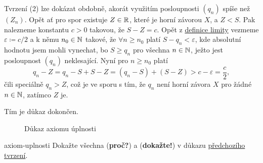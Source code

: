 \begin{propproof}
 Tvrzení (2) lze dokázat obdobně, akorát využitím posloupnosti $(q_n)$ spíše než
 $(Z_n)$. Opět ať pro spor existuje $Z \in \mathbb{R}$, které je horní závorou $X$, a $Z
 < S$. Pak nalezneme konstantu $c > 0$ takovou, že $S - Z = c$. Opět z
 \hyperref[def:limita-posloupnosti]{definice limity} vezmeme $\varepsilon
 \coloneqq c / 2$ a k němu $n_0 \in \mathbb{N}$ takové, že $\forall n \geq n_0$ platí $S
 - q_n < \varepsilon$, kde absolutní hodnotu jsem mohli vynechat, bo $S \geq
 q_n$ pro všechna $n \in \mathbb{N}$, ježto jest posloupnost $(q_n)$ neklesající. Nyní
 pro $n \geq n_0$ platí
 \[
  q_n - Z = q_n - S + S - Z = (q_n - S) + (S - Z) > c - \varepsilon =
  \frac{c}{2},
 \]
 čili speciálně $q_n > Z$, což je ve sporu s tím, že $q_n$ není horní závora $X$
 pro žádné $n \in \mathbb{N}$, zatímco $Z$ je.

 Tím je důkaz dokončen.
\end{propproof}
\begin{figure}[ht]
 \centering
 \begin{subfigure}[b]{.99\textwidth}
  \centering
 \end{subfigure}
 \begin{subfigure}[b]{.99\textwidth}
  \centering
 \end{subfigure}
 \caption{Důkaz axiomu úplnosti}
 \label{fig:axiom-uplnosti}
\end{figure}
\begin{exercise}{}{axiom-uplnosti}
 Dokažte všechna (\textbf{proč?}) a (\textbf{dokažte!}) v důkazu
 \hyperref[prop:axiom-uplnosti]{předchozího tvrzení}.
\end{exercise}

